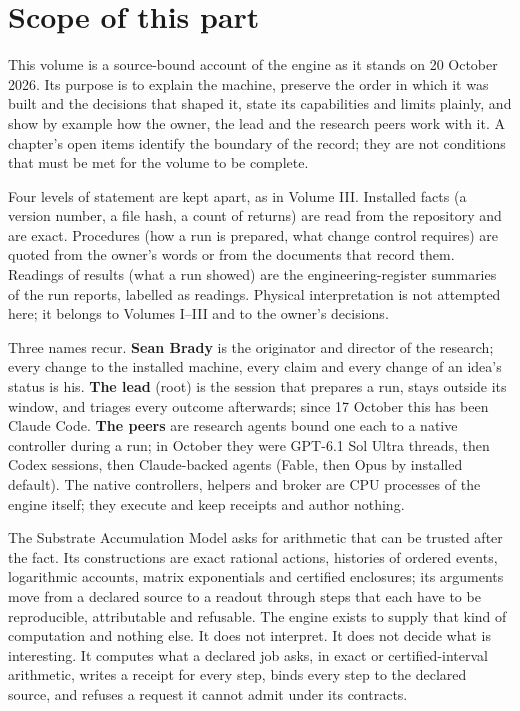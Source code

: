 \section*{Scope of this part}\label{scope-of-this-part}

This volume is a source-bound account of the engine as it stands on 20 October 2026. Its purpose is to explain the machine, preserve the
order in which it was built and the decisions that shaped it, state its capabilities and limits plainly, and show by example how the owner,
the lead and the research peers work with it. A chapter's open items identify the boundary of the record; they are not conditions that must
be met for the volume to be complete.

Four levels of statement are kept apart, as in Volume III. Installed facts (a version number, a file hash, a count of returns) are read from
the repository and are exact. Procedures (how a run is prepared, what change control requires) are quoted from the owner's words or from the
documents that record them. Readings of results (what a run showed) are the engineering-register summaries of the run reports, labelled as
readings. Physical interpretation is not attempted here; it belongs to Volumes I--III and to the owner's decisions.

Three names recur. \textbf{Sean Brady} is the originator and director of the research; every change to the installed machine, every claim and
every change of an idea's status is his. \textbf{The lead} (root) is the session that prepares a run, stays outside its window, and triages every
outcome afterwards; since 17 October this has been Claude Code. \textbf{The peers} are research agents bound one each to a native controller
during a run; in October they were GPT-6.1 Sol Ultra threads, then Codex sessions, then Claude-backed agents (Fable, then Opus by installed
default). The native controllers, helpers and broker are CPU processes of the engine itself; they execute and keep receipts and author nothing.

\label{what-the-engine-is-for}

The Substrate Accumulation Model asks for arithmetic that can be trusted after the fact. Its constructions are exact rational actions,
histories of ordered events, logarithmic accounts, matrix exponentials and certified enclosures; its arguments move from a declared source
to a readout through steps that each have to be reproducible, attributable and refusable. The engine exists to supply that kind of
computation and nothing else. It does not interpret. It does not decide what is interesting. It computes what a declared job asks, in exact
or certified-interval arithmetic, writes a receipt for every step, binds every step to the declared source, and refuses a request it cannot
admit under its contracts.

